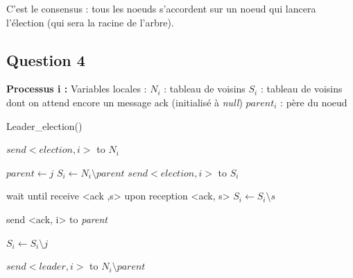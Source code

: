 \documentclass[paper=a4, fontsize=11pt]{article} %
\begin{document}
C'est le consensus : tous les noeuds s'accordent sur un noeud qui lancera l'élection (qui sera la racine de l'arbre).


\subsection{Question 4}

\textbf{Processus i :}
\newline
Variables locales : 
\newline
$ N_{i} $ : tableau de voisins 
\newline
$ S_{i} $ : tableau de voisins dont on attend encore un message ack (initialisé à \textit{null})
\newline
$ parent_{i} $ : père du noeud
\newline
\begin{algorithm}[H]
   \caption{Leader\_election()}
    \begin{algorithmic}[1]


      \Comment{}
			\State $ send <election, i>$ to $ N_{i}$
		\EndIf
       \EndFunction


      \Comment{}
			\State $parent \gets j$
			\State $ S_{i} \gets N_{i} \setminus parent $
			\State $ send <election, i>$ to $ S_{i}$

				\State  wait until receive <ack ,s>
				\State   upon reception <ack, s> 
				\State $ S_{i} \gets S_{i}\setminus s $ 
			\EndWhile

		\EndIf
		\State  send <ack, i> to \textit{parent}
       \EndFunction


      \Comment{}
			\State $ S_{i} \gets S_{i}\setminus j $ 
       \EndFunction



      \Comment{}
			\State $ send <leader, i> $ to $  N_{i} \setminus \textit{parent} $
       \EndFunction
\end{algorithmic}
\end{algorithm}
\end{document}
